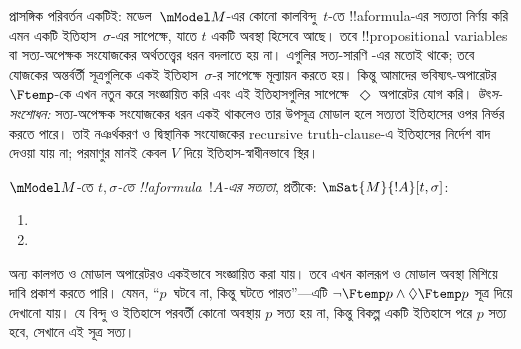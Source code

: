 \documentclass[../../../include/open-logic-section]{subfiles}
\begin{document}
প্রাসঙ্গিক পরিবর্তন একটিই: মডেল~$\mModel M$-এর কোনো কালবিন্দু~$t$-তে !!a{formula}-এর সত্যতা নির্ণয় করি এমন একটি ইতিহাস~$\sigma$-এর সাপেক্ষে, যাতে $t$ একটি অবস্থা হিসেবে আছে। তবে !!{propositional
variable}s বা সত্য-অপেক্ষক সংযোজকের অর্থতত্ত্বের ধরন বদলাতে হয় না। এগুলির সত্য-সারণি -এর মতোই থাকে; তবে যোজকের অন্তর্বর্তী সূত্রগুলিকে একই ইতিহাস~$\sigma$-র সাপেক্ষে মূল্যায়ন করতে হয়। কিন্তু আমাদের ভবিষ্যৎ-অপারেটর~$\Ftemp$-কে এখন নতুন করে সংজ্ঞায়িত করি এবং এই ইতিহাসগুলির সাপেক্ষে~$\Diamond$ অপারেটর যোগ করি।
\emph{উৎস-সংশোধন:} সত্য-অপেক্ষক সংযোজকের ধরন একই থাকলেও তার উপসূত্র মোডাল হলে সত্যতা ইতিহাসের ওপর নির্ভর করতে পারে। তাই নঞর্থকরণ ও দ্বিস্থানিক সংযোজকের recursive truth-clause-এ ইতিহাসের নির্দেশ বাদ দেওয়া যায় না; পরমাণুর মানই কেবল $V$ দিয়ে ইতিহাস-স্বাধীনভাবে স্থির।

\begin{defn}
  $\mModel M$-তে \emph{$t, \sigma$-তে !!a{formula}~$!A$-এর সত্যতা}, প্রতীকে:
  $\mSat{M}{!A}[t, \sigma]$:
  \begin{enumerate}
  \item{} 
  \item{} 
  \end{enumerate}
\end{defn}

অন্য কালগত ও মোডাল অপারেটরও একইভাবে সংজ্ঞায়িত করা যায়। তবে এখন কালরূপ ও মোডাল অবস্থা মিশিয়ে দাবি প্রকাশ করতে পারি। যেমন, ``$p$~ঘটবে না, কিন্তু ঘটতে পারত''—এটি $\lnot \Ftemp p \land \Diamond \Ftemp p$ সূত্র দিয়ে দেখানো যায়। যে বিন্দু ও ইতিহাসে পরবর্তী কোনো অবস্থায় $p$ সত্য হয় না, কিন্তু বিকল্প একটি ইতিহাসে পরে $p$ সত্য হবে, সেখানে এই সূত্র সত্য।
\end{document}
